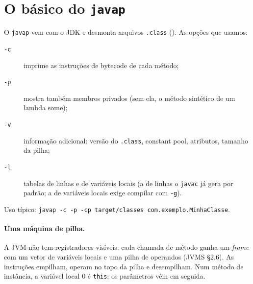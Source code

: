 \section{O básico do \texttt{javap}}
\label{sec:javap-basico}

O \texttt{javap} vem com o JDK e desmonta arquivos \texttt{.class}
(). As opções que usamos:

\begin{description}
\item[\texttt{-c}] imprime as instruções de bytecode de cada método;
\item[\texttt{-p}] mostra também membros privados (sem ela, o método
  sintético de um lambda some);
\item[\texttt{-v}] informação adicional: versão do \texttt{.class},
  constant pool, atributos, tamanho da pilha;
\item[\texttt{-l}] tabelas de linhas e de variáveis locais (a de linhas o
  \texttt{javac} já gera por padrão; a de variáveis locais exige compilar
  com \texttt{-g}).
\end{description}

Uso típico: \texttt{javap -c -p -cp target/classes com.exemplo.MinhaClasse}.

\paragraph{Uma máquina de pilha.}
A JVM não tem registradores visíveis: cada chamada de método ganha um
\emph{frame} com um vetor de variáveis locais e uma pilha de operandos
(JVMS §2.6). As instruções empilham, operam no topo da pilha e
desempilham. Num método de instância, a variável local 0 é
\texttt{this}; os parâmetros vêm em seguida.




